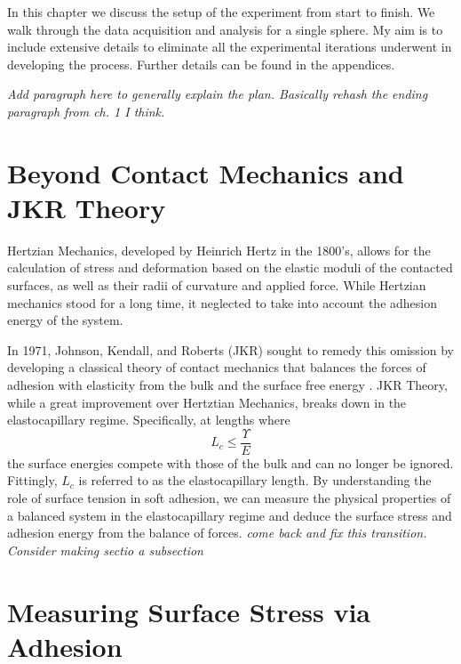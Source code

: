 In this chapter we discuss the setup of the experiment from start to finish. We walk through the data acquisition and analysis for a single sphere. My aim is to include extensive details to eliminate all the experimental iterations underwent in developing the process. Further details can be found in the appendices.

\emph{Add paragraph here to generally explain the plan. Basically rehash the ending paragraph from ch. 1 I think.}

\section{Beyond Contact Mechanics and JKR Theory}

Hertzian Mechanics, developed by Heinrich Hertz in the 1800's, allows for the calculation of stress and deformation based on the elastic moduli of the contacted surfaces, as well as their radii of curvature and applied force. While Hertzian mechanics stood for a long time, it neglected to take into account the adhesion energy of the system.  

In 1971, Johnson, Kendall, and Roberts (JKR) sought to remedy this omission by developing a classical theory of contact mechanics that balances the forces of adhesion with elasticity from the bulk and the surface free energy {\cite{johnson1971surface}}.
JKR Theory, while a great improvement over Hertztian Mechanics, breaks down in the elastocapillary regime. Specifically, at lengths where 
\begin{equation}
\label{EC_regime}
L_{c} \leq \frac{\Upsilon}{E}
\end{equation}
the surface energies compete with those of the bulk and can no longer be ignored. Fittingly, $L_c$ is referred to as the elastocapillary length. By understanding the role of surface tension in soft adhesion, we can measure the physical properties of a balanced system in the elastocapillary regime and deduce the surface stress and adhesion energy from the balance of forces. \emph{come back and fix this transition. Consider making sectio a subsection} 


\section{Measuring Surface Stress via Adhesion}
